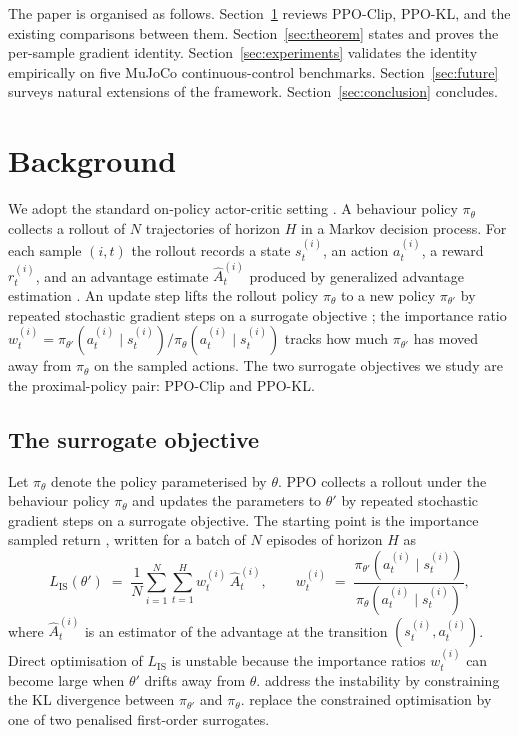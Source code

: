 \documentclass{article}
\begin{document}
The paper is organised as follows.
Section~\ref{sec:background} reviews PPO-Clip, PPO-KL, and the
existing comparisons between them.
Section~\ref{sec:theorem} states and proves the per-sample gradient
identity. Section~\ref{sec:experiments} validates the identity
empirically on five MuJoCo continuous-control benchmarks.
Section~\ref{sec:future} surveys natural extensions of the framework.
Section~\ref{sec:conclusion} concludes.


\section{Background}
\label{sec:background}

We adopt the standard on-policy actor-critic setting
\citep{sutton2018reinforcement, sutton2000policygradient}. A behaviour
policy $\pi_\theta$ collects a rollout of $N$ trajectories of horizon
$H$ in a Markov decision process. For each sample $(i, t)$ the
rollout records a state $s_t^{(i)}$, an action $a_t^{(i)}$, a reward
$r_t^{(i)}$, and an advantage estimate $\hat{A}_t^{(i)}$ produced by
generalized advantage estimation \citep{schulman2016gae}. An update
step lifts the rollout policy $\pi_\theta$ to a new policy
$\pi_{\theta'}$ by repeated stochastic gradient steps on a surrogate
objective \citep{kakade2002approximately, schulman2015trpo}; the
importance ratio $w_t^{(i)} = \pi_{\theta'}(a_t^{(i)} \mid s_t^{(i)})
/ \pi_\theta(a_t^{(i)} \mid s_t^{(i)})$ tracks how much $\pi_{\theta'}$
has moved away from $\pi_\theta$ on the sampled actions. The two
surrogate objectives we study are the proximal-policy
\citep{schulman2017ppo} pair: PPO-Clip and PPO-KL.

\subsection{The surrogate objective}

Let $\pi_\theta$ denote the policy parameterised by $\theta$. PPO
collects a rollout under the behaviour policy $\pi_\theta$ and
updates the parameters to $\theta'$ by repeated stochastic gradient
steps on a surrogate objective. The starting point is the importance
sampled return
\citep{kakade2002approximately, schulman2015trpo}, written for a
batch of $N$ episodes of horizon $H$ as
\[
L_{\mathrm{IS}}(\theta')
\;=\;
\frac{1}{N}\sum_{i=1}^{N}\sum_{t=1}^{H}
w_t^{(i)}\,\hat{A}_t^{(i)},
\qquad
w_t^{(i)} \;=\;
\frac{\pi_{\theta'}\!\left(a_t^{(i)} \mid s_t^{(i)}\right)}
     {\pi_{\theta}\!\left(a_t^{(i)} \mid s_t^{(i)}\right)},
\]
where $\hat{A}_t^{(i)}$ is an estimator of the advantage at the
transition $(s_t^{(i)}, a_t^{(i)})$. Direct optimisation of
$L_{\mathrm{IS}}$ is unstable because the importance ratios
$w_t^{(i)}$ can become large when $\theta'$ drifts away from
$\theta$. \citet{schulman2015trpo} address the instability by
constraining the KL divergence between $\pi_{\theta'}$ and
$\pi_\theta$. \citet{schulman2017ppo} replace the constrained
optimisation by one of two penalised first-order surrogates.
\end{document}
